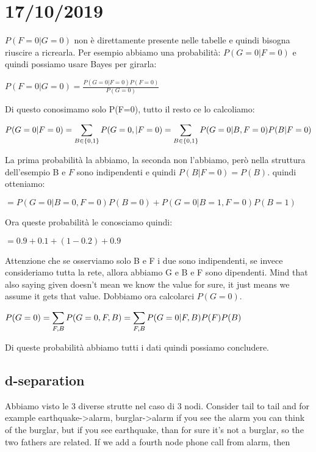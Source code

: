 \chapter{17/10/2019}
$P(F=0\vert G=0)$ non è direttamente presente nelle tabelle e quindi bisogna riuscire a ricrearla.\newline
Per esempio abbiamo una probabilità: $P(G=0\vert F=0)$ e quindi possiamo usare Bayes per girarla:
\begin{center}
	$\displaystyle P(F=0\vert G=0)=\frac{P(G=0\vert F=0)P(F=0)}{P(G=0)}$
\end{center}
Di questo conosimamo solo P(F=0), tutto il resto ce lo calcoliamo:
\begin{center}
	$\displaystyle P(G=0\vert F=0)= \displaystyle\sum_{B \in \{0,1\}} P(G=0, \vert F=0) =
					\displaystyle\sum_{B \in\{0,1\}}P(G=0\vert B,F=0)P(B\vert F=0)$
\end{center}
La prima probabilità la abbiamo, la seconda non l'abbiamo, però nella struttura dell'esempio B e $F$ sono indipendenti e quindi $P(B\vert F=0)=P(B)$. quindi otteniamo:
\begin{center}
	$\displaystyle =P(G=0\vert B=0, F=0)P(B=0)+P(G=0\vert B=1, F=0)P(B=1)$
\end{center}
Ora queste probabilità le conosciamo quindi:
\begin{center}
	$\displaystyle =0.9+0.1+(1-0.2)+0.9$
\end{center}
Attenzione che se osserviamo solo B e F i due sono indipendenti, se invece consideriamo tutta la rete, allora abbiamo G e B e F sono dipendenti. Mind that also saying given doesn't mean we know the value for sure, it just means we assume it gets that value. \newline
Dobbiamo ora calcolarci $P(G=0)$. 
\begin{center}
	$\displaystyle P(G=0)=\displaystyle\sum_{F,B}P(G=0, F, B)=\displaystyle\sum_{F,B}P(G=0\vert F, B)P(F)P(B)$
\end{center}
Di queste probabilità abbiamo tutti i dati quindi possiamo concludere.\newline
\section{d-separation}
Abbiamo visto le 3 diverse strutte nel caso di 3 nodi. Consider tail to tail and for example earthquake->alarm, burglar->alarm if you see the alarm you can think of the burglar, but if you see earthquake, than for sure it's not a burglar, so the two fathers are related. \newline
If we add a fourth node phone call from alarm, then
